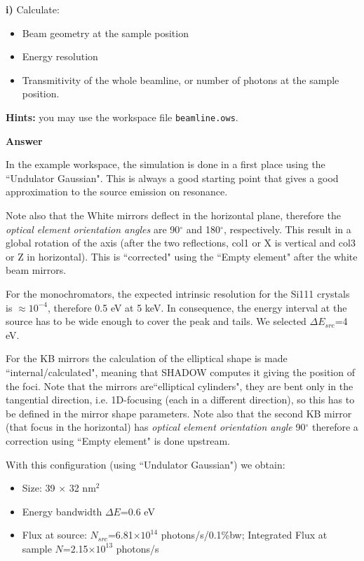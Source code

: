 \textbf{i)} Calculate:
\begin{itemize}
    \item Beam geometry at the sample position
    \item Energy resolution
    \item Transmitivity of the whole beamline, or number of photons at the sample position.
\end{itemize}

\textbf{Hints:} you may use the workspace file {\tt beamline.ows}.


\textbf{Answer}

In the example workspace, the simulation is done in a first place using the ``Undulator Gaussian". This is always a good starting point that gives a good approximation to the source emission on resonance. 

Note also that the White mirrors deflect in the horizontal plane, therefore the {\it optical element orientation angles} are 90$^\circ$ and 180$^\circ$, respectively. This result in a global rotation of the axis (after the two reflections, col1 or X is vertical and col3 or Z in horizontal). This is ``corrected" using the ``Empty element" after the white beam mirrors.

For the monochromators, the expected intrinsic resolution for the Si111 crystals is $\approx 10^{-4}$, therefore 0.5 eV at 5 keV. In consequence, the energy interval at the source has to be wide enough to cover the peak and tails. We selected $\Delta E_{src}$=4 eV.

For the KB mirrors the calculation of the elliptical shape is made ``internal/calculated", meaning that SHADOW computes it giving the position of the foci. Note that the mirrors are``elliptical cylinders", they are bent only in the tangential direction, i.e. 1D-focusing (each in a different direction), so this has to be defined in the mirror shape parameters. Note also that the second KB mirror (that focus in the horizontal) has {\it optical element orientation angle} 90$^\circ$ therefore a correction using ``Empty element" is done upstream.  

With this configuration (using ``Undulator Gaussian") we obtain:
\begin{itemize}
    \item Size: 39 $\times$ 32 nm$^2$
    \item Energy bandwidth $\Delta E$=0.6 eV
    \item Flux at source: $N_{src}$=6.81$\times 10^{14}$ photons/s/0.1\%bw; Integrated Flux at sample $N$=2.15$\times 10^{13}$ photons/s 
\end{itemize}

